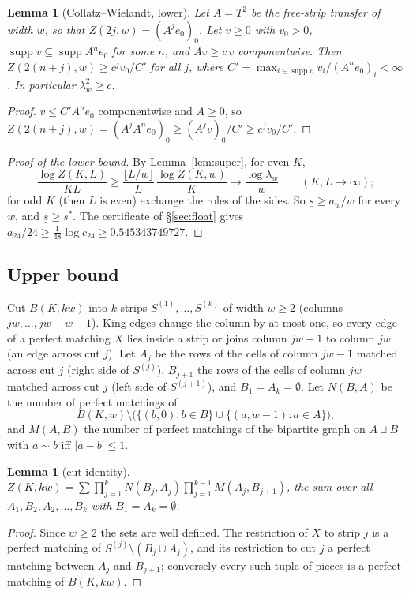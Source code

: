 \documentclass[11pt]{amsart}
\newtheorem{lemma}[theorem]{Lemma}
\theoremstyle{definition}
\theoremstyle{remark}
\newcommand{\supp}{\operatorname{supp}}
\begin{document}
\begin{lemma}[Collatz--Wielandt, lower]\label{lem:cwlow}
Let $A = T^2$ be the free-strip transfer of width $w$, so that $Z(2j, w) = (A^j e_0)_0$. Let
$v \ge 0$ with $v_0 > 0$, $\supp v \subseteq \supp A^n e_0$ for some $n$, and $Av \ge c\,v$
componentwise. Then $Z(2(n + j), w) \ge c^j v_0 / C'$ for all $j$, where
$C' = \max_{i \in \supp v} v_i / (A^n e_0)_i < \infty$. In particular $\lambda_w^2 \ge c$.
\end{lemma}
\begin{proof}
$v \le C' A^n e_0$ componentwise and $A \ge 0$, so
$Z(2(n+j), w) = (A^j A^n e_0)_0 \ge (A^j v)_0 / C' \ge c^j v_0 / C'$.
\end{proof}

\begin{proof}[Proof of the lower bound]
By Lemma~\ref{lem:super}, for even $K$,
\[
  \frac{\log Z(K, L)}{KL} \ge \frac{\lfloor L/w\rfloor}{L}\,\frac{\log Z(K, w)}{K}
  \longrightarrow \frac{\log\lambda_w}{w} \qquad (K, L \to \infty);
\]
for odd $K$ (then $L$ is even) exchange the roles of the sides. So $\underline s \ge a_w / w$ for every $w$, and
$\underline s \ge s^*$. The certificate of \S\ref{sec:float} gives
$a_{24}/24 \ge \frac{1}{48}\log c_{24} \ge 0.545343749727$.
\end{proof}

\subsection{Upper bound}
Cut $B(K, kw)$ into $k$ strips $S^{(1)}, \dots, S^{(k)}$ of width $w \ge 2$ (columns
$jw, \dots, jw + w - 1$). King edges change the column by at most one, so every edge of a perfect
matching $X$ lies inside a strip or joins column $jw - 1$ to column $jw$ (an edge across cut $j$).
Let $A_j$ be the rows of the cells of column $jw - 1$ matched across cut $j$ (right side of
$S^{(j)}$), $B_{j+1}$ the rows of the cells of column $jw$ matched across cut $j$ (left side of
$S^{(j+1)}$), and $B_1 = A_k = \emptyset$. Let $N(B, A)$ be the number of perfect matchings of
\[
  B(K, w) \setminus \bigl(\{(b, 0) : b \in B\} \cup \{(a, w-1) : a \in A\}\bigr),
\]
and $M(A, B)$ the number of perfect matchings of the bipartite graph on $A \sqcup B$ with
$a \sim b$ iff $|a - b| \le 1$.

\begin{lemma}[cut identity]\label{lem:cut}
$Z(K, kw) = \sum \prod_{j=1}^{k} N(B_j, A_j) \prod_{j=1}^{k-1} M(A_j, B_{j+1})$, the sum over all
$A_1, B_2, A_2, \dots, B_k$ with $B_1 = A_k = \emptyset$.
\end{lemma}
\begin{proof}
Since $w \ge 2$ the sets are well defined. The restriction of $X$ to strip $j$ is a perfect matching
of $S^{(j)} \setminus (B_j \cup A_j)$, and its restriction to cut $j$ a perfect matching between
$A_j$ and $B_{j+1}$; conversely every such tuple of pieces is a perfect matching of $B(K, kw)$.
\end{proof}
\end{document}

